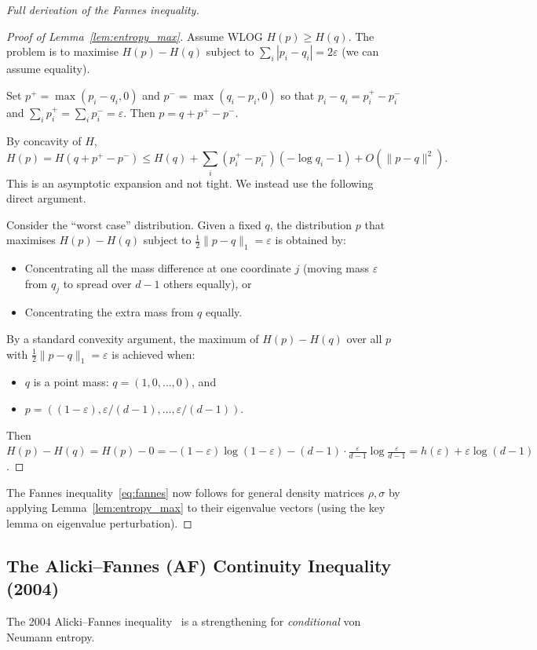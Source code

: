 \documentclass[12pt,a4paper]{article}
\begin{document}
\begin{proof}[Full derivation of the Fannes inequality]
\begin{proof}[Proof of Lemma~\ref{lem:entropy_max}]
Assume WLOG $H(p)\geq H(q)$.  The problem is to maximise $H(p)-H(q)$ subject
to $\sum_i|p_i-q_i|=2\varepsilon$ (we can assume equality).

Set $p^+=\max(p_i-q_i,0)$ and $p^-=\max(q_i-p_i,0)$ so that
$p_i-q_i=p_i^+-p_i^-$ and $\sum_ip_i^+=\sum_ip_i^-=\varepsilon$.
Then $p=q+p^+-p^-$.

By concavity of $H$,
\[
  H(p) = H(q+p^+-p^-)
  \leq H(q) + \sum_i(p_i^+-p_i^-)(-\log q_i-1)
     + O(\|p-q\|^2).
\]
This is an asymptotic expansion and not tight.  We instead use the following
direct argument.

Consider the ``worst case'' distribution.  Given a fixed $q$, the distribution
$p$ that maximises $H(p)-H(q)$ subject to $\frac{1}{2}\|p-q\|_1=\varepsilon$
is obtained by:
\begin{itemize}
  \item Concentrating all the mass difference at one coordinate $j$ (moving
        mass $\varepsilon$ from $q_j$ to spread over $d-1$ others equally), or
  \item Concentrating the extra mass from $q$ equally.
\end{itemize}
By a standard convexity argument, the maximum of $H(p)-H(q)$ over all $p$
with $\frac{1}{2}\|p-q\|_1=\varepsilon$ is achieved when:
\begin{itemize}
  \item $q$ is a point mass: $q=(1,0,\ldots,0)$, and
  \item $p=((1-\varepsilon),\varepsilon/(d-1),\ldots,\varepsilon/(d-1))$.
\end{itemize}
Then $H(p)-H(q)=H(p)-0=-(1-\varepsilon)\log(1-\varepsilon)
-(d-1)\cdot\frac{\varepsilon}{d-1}\log\frac{\varepsilon}{d-1}
=h(\varepsilon)+\varepsilon\log(d-1)$.
\end{proof}

The Fannes inequality~\eqref{eq:fannes} now follows for general density
matrices $\rho,\sigma$ by applying Lemma~\ref{lem:entropy_max} to their
eigenvalue vectors (using the key lemma on eigenvalue perturbation).
\end{proof}

\subsection{The Alicki--Fannes (AF) Continuity Inequality (2004)}

The 2004 Alicki--Fannes inequality~\cite{af2004} is a strengthening for
\emph{conditional} von Neumann entropy.
\end{document}
